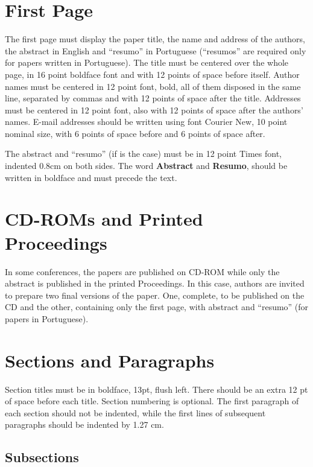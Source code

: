 \documentclass[12pt]{article}
\begin{document}
\section{First Page} \label{sec:firstpage}

The first page must display the paper title, the name and address of the
authors, the abstract in English and ``resumo'' in Portuguese (``resumos'' are
required only for papers written in Portuguese). The title must be centered
over the whole page, in 16 point boldface font and with 12 points of space
before itself. Author names must be centered in 12 point font, bold, all of
them disposed in the same line, separated by commas and with 12 points of
space after the title. Addresses must be centered in 12 point font, also with
12 points of space after the authors' names. E-mail addresses should be
written using font Courier New, 10 point nominal size, with 6 points of space
before and 6 points of space after.

The abstract and ``resumo'' (if is the case) must be in 12 point Times font,
indented 0.8cm on both sides. The word \textbf{Abstract} and \textbf{Resumo},
should be written in boldface and must precede the text.

\section{CD-ROMs and Printed Proceedings}

In some conferences, the papers are published on CD-ROM while only the
abstract is published in the printed Proceedings. In this case, authors are
invited to prepare two final versions of the paper. One, complete, to be
published on the CD and the other, containing only the first page, with
abstract and ``resumo'' (for papers in Portuguese).

\section{Sections and Paragraphs}

Section titles must be in boldface, 13pt, flush left. There should be an extra
12 pt of space before each title. Section numbering is optional. The first
paragraph of each section should not be indented, while the first lines of
subsequent paragraphs should be indented by 1.27 cm.

\subsection{Subsections}
\end{document}
